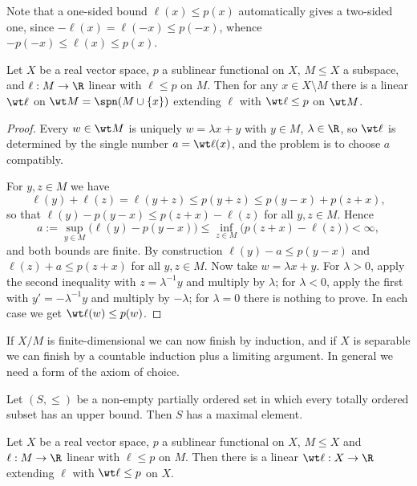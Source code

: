 Note that a one-sided bound $\ell(x) \le p(x)$ automatically gives a two-sided one, since $-\ell(x) = \ell(-x) \le p(-x)$, whence $-p(-x) \le \ell(x) \le p(x)$.

\begin{lemma}\label{lem:banachext}
	Let $X$ be a real vector space, $p$ a sublinear functional on $X$, $M \le X$ a subspace, and $\ell : M \to \R$ linear with $\ell \le p$ on $M$. Then for any $x \in X \setminus M$ there is a linear $\wt\ell$ on $\wt M = \spn(M \cup \{x\})$ extending $\ell$ with $\wt\ell \le p$ on $\wt M$.
\end{lemma}

\begin{proof}
	Every $w \in \wt M$ is uniquely $w = \lambda x + y$ with $y \in M$, $\lambda \in \R$, so $\wt \ell$ is determined by the single number $a = \wt\ell(x)$, and the problem is to choose $a$ compatibly.

	For $y, z \in M$ we have
	$$\ell(y) + \ell(z) = \ell(y+z) \le p(y+z) \le p(y - x) + p(z+x),$$
	so that $\ell(y) - p(y-x) \le p(z+x) - \ell(z)$ for all $y,z \in M$. Hence
	$$a := \sup_{y \in M} \big( \ell(y) - p(y-x)\big) \le \inf_{z \in M}\big( p(z+x)-\ell(z)\big) < \infty,$$
	and both bounds are finite. By construction $\ell(y) - a \le p(y - x)$ and $\ell(z) + a \le p(z+x)$ for all $y, z \in M$. Now take $w = \lambda x + y$. For $\lambda > 0$, apply the second inequality with $z = \lambda^{-1}y$ and multiply by $\lambda$; for $\lambda < 0$, apply the first with $y' = -\lambda^{-1}y$ and multiply by $-\lambda$; for $\lambda = 0$ there is nothing to prove. In each case we get $\wt\ell(w) \le p(w)$.
\end{proof}

If $X/M$ is finite-dimensional we can now finish by induction, and if $X$ is separable we can finish by a countable induction plus a limiting argument. In general we need a form of the axiom of choice.

\begin{proposition}\label{prop:zorn}
	Let $(S, \le)$ be a non-empty partially ordered set in which every totally ordered subset has an upper bound. Then $S$ has a maximal element.
\end{proposition}

\begin{theorem}\label{thm:hahnbanach}
	Let $X$ be a real vector space, $p$ a sublinear functional on $X$, $M \le X$ and $\ell : M \to \R$ linear with $\ell \le p$ on $M$. Then there is a linear $\wt\ell : X \to \R$ extending $\ell$ with $\wt\ell \le p$ on $X$.
\end{theorem}

